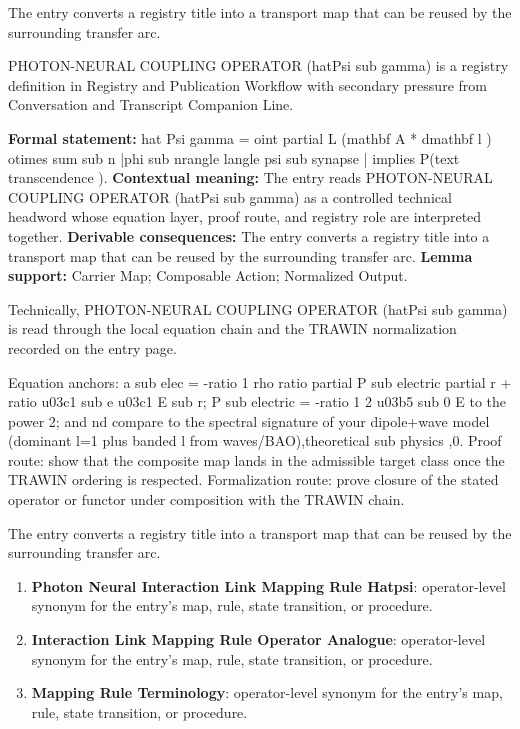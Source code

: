 The entry converts a registry title into a transport map that can be reused by the surrounding transfer arc.
\clearpage


\begingroup\small
{}
PHOTON-NEURAL COUPLING OPERATOR (hatPsi sub gamma) is a registry definition in Registry and Publication Workflow with secondary pressure from Conversation and Transcript Companion Line.

\begingroup\footnotesize\setlength{\emergencystretch}{3em}\sloppy
\textbf{Formal statement:} hat Psi gamma = oint partial L (mathbf A * dmathbf l ) otimes sum sub n |phi sub nrangle langle psi sub synapse | implies P(text transcendence ). \textbf{Contextual meaning:} The entry reads PHOTON-NEURAL COUPLING OPERATOR (hatPsi sub gamma) as a controlled technical headword whose equation layer, proof route, and registry role are interpreted together. \textbf{Derivable consequences:} The entry converts a registry title into a transport map that can be reused by the surrounding transfer arc. \textbf{Lemma support:} Carrier Map; Composable Action; Normalized Output.\par
\endgroup

Technically, PHOTON-NEURAL COUPLING OPERATOR (hatPsi sub gamma) is read through the local equation chain and the TRAWIN normalization recorded on the entry page.

Equation anchors: a sub elec = -ratio 1 rho ratio partial P sub electric partial r + ratio u03c1 sub e u03c1 E sub r; P sub electric = -ratio 1 2 u03b5 sub 0 E to the power 2; and nd compare to the spectral signature of your dipole+wave model (dominant l=1 plus banded l from waves/BAO),theoretical sub physics ,0. Proof route: show that the composite map lands in the admissible target class once the TRAWIN ordering is respected. Formalization route: prove closure of the stated operator or functor under composition with the TRAWIN chain.

The entry converts a registry title into a transport map that can be reused by the surrounding transfer arc.
\endgroup

\begin{enumerate}[leftmargin=1.6em,itemsep=6pt,topsep=4pt]
\item \textbf{Photon Neural Interaction Link Mapping Rule Hatpsi}: operator-level synonym for the entry's map, rule, state transition, or procedure.
\item \textbf{Interaction Link Mapping Rule Operator Analogue}: operator-level synonym for the entry's map, rule, state transition, or procedure.
\item \textbf{Mapping Rule Terminology}: operator-level synonym for the entry's map, rule, state transition, or procedure.
\end{enumerate}

